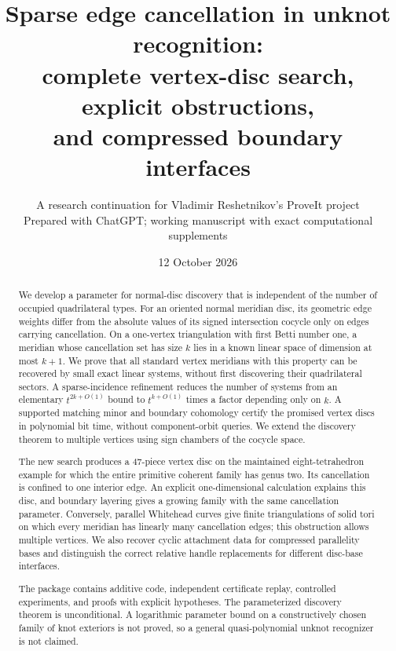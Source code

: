 \documentclass[11pt]{article}
\title{Sparse edge cancellation in unknot recognition:\\
complete vertex-disc search, explicit obstructions,\\
and compressed boundary interfaces}
\author{A research continuation for Vladimir Reshetnikov's ProveIt project\\
\small Prepared with ChatGPT; working manuscript with exact computational supplements}
\date{12 October 2026}
\theoremstyle{definition}
\theoremstyle{remark}
\begin{document}
\maketitle
\begin{abstract}
We develop a parameter for normal-disc discovery that is independent of the
number of occupied quadrilateral types. For an oriented normal meridian
disc, its geometric edge weights differ from the absolute values of its
signed intersection cocycle only on edges carrying cancellation. On a
one-vertex triangulation with first Betti number one, a meridian whose
cancellation set has size $k$ lies in a known linear space of dimension at
most $k+1$. We prove that all standard vertex meridians with this property
can be recovered by small exact linear systems, without first discovering
their quadrilateral sectors. A sparse-incidence refinement reduces the
number of systems from an elementary $t^{2k+O(1)}$ bound to
$t^{k+O(1)}$ times a factor depending only on $k$. A supported matching
minor and boundary cohomology certify the promised vertex discs in
polynomial bit time, without component-orbit queries. We extend the
discovery theorem to multiple vertices using sign chambers of the cocycle
space.

The new search produces a 47-piece vertex disc on the maintained
eight-tetrahedron example for which the entire primitive coherent family
has genus two. Its cancellation is confined to one interior edge. An
explicit one-dimensional calculation explains this disc, and boundary
layering gives a growing family with the same cancellation parameter.
Conversely, parallel Whitehead curves give finite triangulations of solid
tori on which every meridian has linearly many cancellation edges; this
obstruction allows multiple vertices. We also recover cyclic attachment
data for compressed parallelity bases and distinguish the correct relative
handle replacements for different disc-base interfaces.

The package contains additive code, independent certificate replay,
controlled experiments, and proofs with explicit hypotheses. The
parameterized discovery theorem is unconditional. A logarithmic parameter
bound on a constructively chosen family of knot exteriors is not proved,
so a general quasi-polynomial unknot recognizer is not claimed.
\end{abstract}
\clearpage
{\small\setlength{\parskip}{0pt}\tableofcontents}
\clearpage






\end{document}
